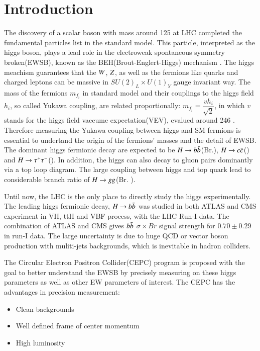 \section{Introduction}\label{sec:introduction}
The discovery of a scalar boson with mass around 125 \GeV at LHC \cite{Higgs_ATLAS, Higgs_CMS} completed the fundamental particles list in the standard model.
This particle, interpreted as the higgs boson, plays a lead role in the electroweak spontaneous symmetry broken(EWSB), 
known as the BEH(Brout-Englert-Higgs) mechanism \cite{BEH,BEH2}.
The higgs meachism guarantees that the $W$, $Z$, as well as the fermions 
like quarks and charged leptons can be massive in $SU(2)_L \times U(1)_Y$ gauge invariant way.
The mass of the fermions $m_{f_i}$ in standard model and their couplings to the higgs field $h_i$, so called Yukawa coupling, are related proportionally: $m_{f_i} = \dfrac{vh_i}{\sqrt{2}}$, in which $v$ stands for the higgs field vaccume expectation(VEV), evalued around 246 \GeV. 
Therefore measuring the Yukawa coupling between higgs and SM fermions is essential to undertand the origin of the fermions' masses and the detail of EWSB.
The dominant higgs fermionic decay are expected to be $H\rightarrow b\bar{b}$(Br.), $H\rightarrow c\bar{c}$() and $H\rightarrow\tau^{+}\tau^{-}$(). 
In addition, the higgs can also decay to gluon pairs dominantly via a top loop diagram. The large coupling between higgs and top quark lead to considerable 
branch ratio of $H\rightarrow gg$(Br. ). 
\par
Until now, the LHC is the only place to directly study the higgs experimentally. 
The leading higgs fermionic decay,  $H\rightarrow b\bar{b}$ was studied in both ATLAS and CMS experiment in VH\cite{VH_bb_atlas,VH_bb_cms}, ttH\cite{ttH_bb_cms} and VBF\cite{VBF_bb_atlas,VBF_bb_cms} process, with the LHC Run-I data.
The combination of ATLAS and CMS gives $b\bar{b}$ $\sigma\times Br$ signal strength for $0.70\pm0.29$ in run-I data\cite{higgs_atlas_cms_combine}. The large uncertainty is due to huge QCD or vector boson production with muliti-jets backgrounds, which is inevitable in hadron colliders. 
\par
The Circular Electron Positron Collider(CEPC) \cite{CEPC_preCDR} program is proposed with the goal to better understand the EWSB
 by precisely measuring on these higgs parameters as well as other EW parameters of interest. 
 The CEPC has the advantages in precision measurement:
 \begin{itemize}
 \item Clean backgrounds
 \item Well defined frame of center momentum
 \item High luminosity
 \end{itemize}

